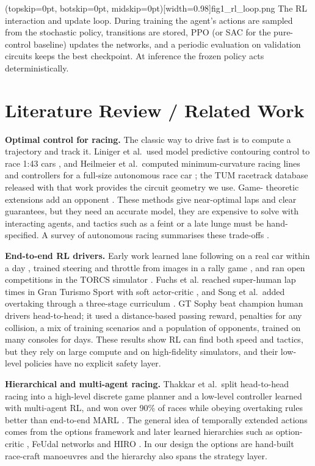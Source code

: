 \documentclass{ieeeaccess}
\begin{document}
\Figure[t!](topskip=0pt, botskip=0pt, midskip=0pt)[width=0.98\columnwidth]{fig1_rl_loop.png}
{The RL interaction and update loop. During training the agent's actions are sampled from the stochastic policy, transitions are stored, PPO (or SAC for the pure-control baseline) updates the networks, and a periodic evaluation on validation circuits keeps the best checkpoint. At inference the frozen policy acts deterministically.\label{fig:fig1_rl_loop}}

\section{Literature Review / Related Work}

\textbf{Optimal control for racing.} The classic way to drive fast is to compute a
trajectory and track it. Liniger et al.~used model predictive contouring control
to race 1:43 cars \cite{b11}, and Heilmeier et al.~computed minimum-curvature racing
lines and controllers for a full-size autonomous race car \cite{b12}; the TUM racetrack
database released with that work provides the circuit geometry we use. Game-
theoretic extensions add an opponent \cite{b15}. These methods give near-optimal laps
and clear guarantees, but they need an accurate model, they are expensive to solve
with interacting agents, and tactics such as a feint or a late lunge must be
hand-specified. A survey of autonomous racing summarises these trade-offs \cite{b9}.

\textbf{End-to-end RL drivers.} Early work learned lane following on a real car within
a day \cite{b16}, trained steering and throttle from images in a rally game \cite{b17}, and
ran open competitions in the TORCS simulator \cite{b18}. Fuchs et al.
reached super-human lap times in Gran Turismo Sport with soft actor-critic \cite{b13},
and Song et al.~added overtaking through a three-stage curriculum \cite{b19}. GT Sophy
\cite{b14} beat champion human drivers head-to-head; it used a distance-based passing
reward, penalties for any collision, a mix of training scenarios and a population
of opponents, trained on many consoles for days. These results show RL can find
both speed and tactics, but they rely on large compute and on high-fidelity
simulators, and their low-level policies have no explicit safety layer.

\textbf{Hierarchical and multi-agent racing.} Thakkar et al.~split head-to-head racing
into a high-level discrete game planner and a low-level controller learned with
multi-agent RL, and won over 90\% of races while obeying overtaking rules better
than end-to-end MARL \cite{b20}. The general idea of temporally extended actions comes
from the options framework \cite{b21} and later learned hierarchies such as option-critic
\cite{b22}, FeUdal networks \cite{b23} and HIRO \cite{b24}. In our design the options are hand-built
race-craft manoeuvres and the hierarchy also spans the strategy layer.
\end{document}
